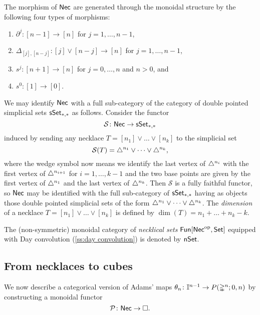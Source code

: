 The morphism of $\mathsf{Nec}$ are generated through the monoidal structure by the following four types of morphisms:
\begin{enumerate}
	\item $\partial^j \colon [n-1] \to [n]$ for $j = 1, \dots, n-1$,
	\item $\Delta_{[j], [n-j]} \colon [j] \vee [n-j] \to [n]$ for $j = 1, \dots, n-1$,
	\item $s^j \colon [n+1] \to [n]$ for $j = 0, \dots, n$ and $n>0$, and
	\item $s^0 \colon [1] \to [0]$.
\end{enumerate}
We may identify $\mathsf{Nec}$ with a full sub-category of the category of double pointed simplicial sets $\mathsf{sSet}_{*,*}$ as follows.
Consider the functor
\[
\mathcal{S} \colon \mathsf{Nec} \to \mathsf{sSet}_{*,*}
\]
 induced by sending any necklace $T = [n_1] \vee \dots \vee[n_k]$ to the simplicial set
\[
\mathcal{S}(T) = \triangle^{n_1} \vee \dots \vee \triangle^{n_k},
\]
where the wedge symbol now means we identify the last vertex of $\triangle^{n_i}$ with the first vertex of $\triangle^{n_{i+1}}$ for $i = 1, \dots, k-1$ and the two base points are given by the first vertex of $\triangle^{n_1}$ and the last vertex of $\triangle^{n_k}$.
Then $\mathcal{S}$ is a fully faithful functor, so $\mathsf{Nec}$ may be identified with the full sub-category of $\mathsf{sSet}_{*,*}$ having as objects those double pointed simplicial sets of the form $\triangle^{n_1} \vee \dots \vee \triangle^{n_k}$.
The \textit{dimension} of a necklace $T = [n_1] \vee \dots \vee[n_k]$ is defined by $\dim(T) = n_1 + \dots + n_k-k$.

The (non-symmetric) monoidal category of \textit{necklical sets} $\mathsf{Fun}[\mathsf{Nec}^{\mathrm{op}}, \mathsf{Set}]$ equipped with Day convolution (\cref{ss:day convolution}) is denoted by $\mathsf{nSet}$.

\subsection{From necklaces to cubes}

We now describe a categorical version of Adams' maps $\theta_n \colon \mathbb{I}^{n-1} \to P(\mathbb{\Delta}^{n};0,n)$ by constructing a monoidal functor
\[
\mathcal{P} \colon \mathsf{Nec} \to \square.
\]

